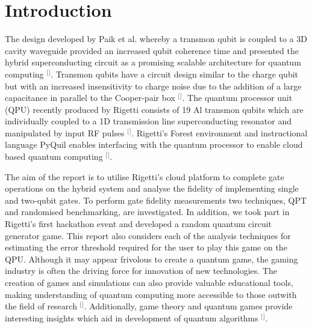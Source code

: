 \section{\label{sec:level1}Introduction} 
The design developed by Paik et al. whereby a transmon qubit is coupled to a 3D cavity waveguide provided an increased qubit coherence time and presented the hybrid superconducting circuit as a promising scalable architecture for quantum computing $^{[}$\citep{Paik2011ObservationArchitecture}$^{]}$. Transmon qubits have a circuit design similar to the charge qubit but with an increased insensitivity to charge noise due to the addition of a large capacitance in parallel to the Cooper-pair box $^{[}$\citep{Koch2007Charge-insensitiveBox}$^{]}$. The quantum processor unit (QPU) recently produced by Rigetti consists of 19 Al transmon qubits which are individually coupled to a 1D transmission line superconducting resonator and manipulated by input RF pulses $^{[}$\citep{Otterbach2017UnsupervisedComputer,Blais2004CavityComputation}$^{]}$. Rigetti's Forest environment and instructional language PyQuil enables interfacing with the quantum processor to enable cloud based quantum computing $^{[}$\citep{Smith2016AArchitecture}$^{]}$. 

The aim of the report is to utilise Rigetti's cloud platform to complete gate operations on the hybrid system and analyse the fidelity of implementing single and two-qubit gates. To perform gate fidelity measurements two techniques, QPT and randomised benchmarking, are investigated. In addition, we took part in Rigetti's first hackathon event and developed a random quantum circuit generator game. This report also considers each of the analysis techniques for estimating the error threshold required for the user to play this game on the QPU. Although it may appear frivolous to create a quantum game, the gaming industry is often the driving force for innovation of new technologies. The creation of games and simulations can also provide valuable educational tools, making understanding of quantum computing more accessible to those outwith the field of research $^{[}$\citep{Bekebrede2011ReviewingGeneration}$^{]}$. Additionally, game theory and quantum games provide interesting insights which aid in development of quantum algorithms $^{[}$\citep{Flitney2002AnTheory}$^{]}$.




 


 
 













